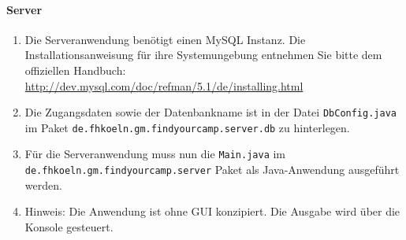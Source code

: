 \paragraph{Server}

\begin{enumerate}
	\item Die Serveranwendung benötigt einen MySQL Instanz. Die Installationsanweisung für ihre Systemungebung entnehmen Sie bitte dem offiziellen Handbuch: \url{http://dev.mysql.com/doc/refman/5.1/de/installing.html}
	\item Die Zugangsdaten sowie der Datenbankname ist in der Datei \texttt{DbConfig.java} im Paket \texttt{de.fhkoeln.gm.findyourcamp.server.db} zu hinterlegen.
	\item Für die Serveranwendung muss nun die \texttt{Main.java} im \texttt{de.fhkoeln.gm.findyourcamp.server} Paket als Java-Anwendung ausgeführt werden.
	\item Hinweis: Die Anwendung ist ohne GUI konzipiert. Die Ausgabe wird über die Konsole gesteuert.
\end{enumerate}
